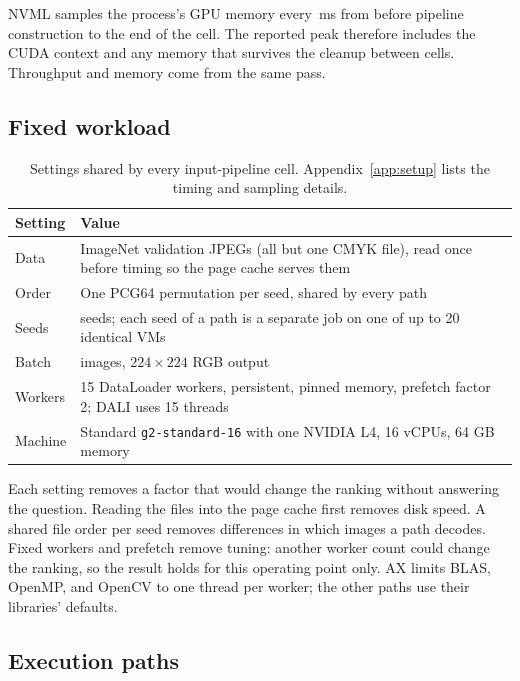 \documentclass[11pt]{article}
\begin{document}
NVML samples the process's GPU memory every \MemoryPollMs{}\,ms from before pipeline
construction to the end of the cell. The reported peak therefore includes the CUDA context and
any memory that survives the cleanup between cells. Throughput and memory come from the same pass.

\subsection{Fixed workload}

\begin{table}[H]
\centering\small
{}
\begin{tabularx}{\textwidth}{p{3.2cm}Y}
\textbf{Setting} & \textbf{Value} \\ \midrule
Data & \DatasetFiles{} ImageNet validation JPEGs \cite{imagenet} (all but one CMYK file), read once before timing so the page cache serves them \\
Order & One PCG64 permutation per seed, shared by every path \\
Seeds & \SeedCount{} seeds; each seed of a path is a separate job on one of up to 20 identical VMs \\
Batch & \BatchSize{} images, \(224\times224\) RGB output \\
Workers & 15 DataLoader workers, persistent, pinned memory, prefetch factor 2; DALI uses 15 threads \\
Machine & Standard \texttt{g2-standard-16} with one NVIDIA L4, 16 vCPUs, 64 GB memory \cite{gcp} \\
\end{tabularx}
\caption{Settings shared by every input-pipeline cell. Appendix~\ref{app:setup} lists the timing
and sampling details.}
\label{tab:setup}
\end{table}

Each setting removes a factor that would change the ranking without answering the question.
Reading the files into the page cache first removes disk speed. A shared file order per seed
removes differences in which images a path decodes. Fixed workers and prefetch remove tuning:
another worker count could change the ranking, so the result holds for this operating point
only. AX limits BLAS, OpenMP, and OpenCV to one thread per worker; the other paths use their
libraries' defaults.

\subsection{Execution paths}
\end{document}
